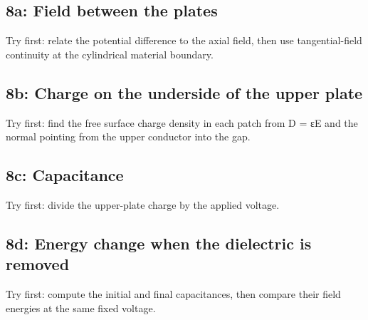 \documentclass[11pt]{article}
\begin{document}
\begin{keepsection}
\begin{keepsection}
\subsection{8a: Field between the plates}

Try first: relate the potential difference to the axial field, then use tangential-field continuity at the cylindrical material boundary.

\end{keepsection}

\begin{keepsection}
\subsection{8b: Charge on the underside of the upper plate}

Try first: find the free surface charge density in each patch from D = εE and the normal pointing from the upper conductor into the gap.

\end{keepsection}

\begin{keepsection}
\subsection{8c: Capacitance}

Try first: divide the upper-plate charge by the applied voltage.

\end{keepsection}

\begin{keepsection}
\subsection{8d: Energy change when the dielectric is removed}

Try first: compute the initial and final capacitances, then compare their field energies at the same fixed voltage.

\end{keepsection}
\end{keepsection}
\end{document}
